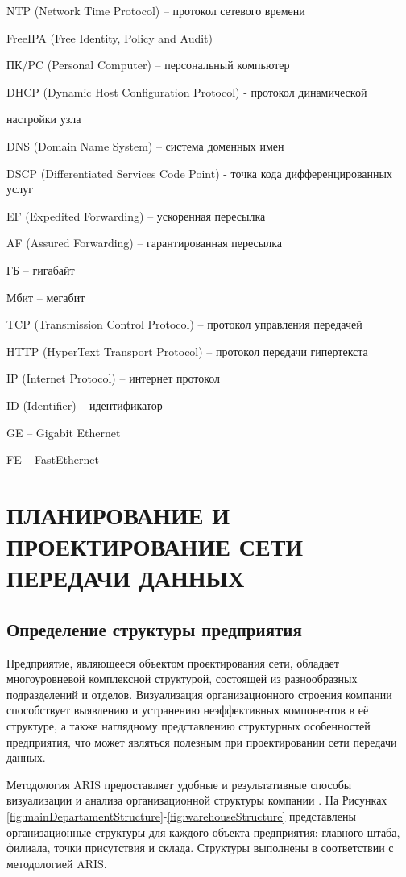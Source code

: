 \documentclass[14pt, a4paper]{extarticle}
\numberwithin{equation}{section}
\begin{document}
NTP (Network Time Protocol) – протокол сетевого времени

FreeIPA (Free Identity, Policy and Audit)

ПК/PC (Personal Computer) – персональный компьютер

DHCP (Dynamic Host Configuration Protocol) - протокол динамической

настройки узла

DNS (Domain Name System) – система доменных имен

DSCP (Differentiated Services Code Point) - точка кода дифференцированных
услуг

EF (Expedited Forwarding) – ускоренная пересылка

AF (Assured Forwarding) – гарантированная пересылка

ГБ – гигабайт

Мбит – мегабит

TCP (Transmission Control Protocol) – протокол управления передачей

HTTP (HyperText Transport Protocol) – протокол передачи гипертекста

IP (Internet Protocol) – интернет протокол

ID (Identifier) – идентификатор

GE – Gigabit Ethernet

FE – FastEthernet


\section{ПЛАНИРОВАНИЕ И ПРОЕКТИРОВАНИЕ СЕТИ ПЕРЕДАЧИ ДАННЫХ}

\subsection{Определение структуры предприятия}
Предприятие, являющееся объектом проектирования сети, обладает многоуровневой 
комплексной структурой, состоящей из разнообразных подразделений и отделов. 
Визуализация организационного строения компании способствует выявлению и устранению
неэффективных компонентов в её структуре, а также наглядному представлению структурных
особенностей предприятия, что может являться полезным при проектировании сети передачи
данных.


Методология ARIS предоставляет удобные и результативные 
способы визуализации и анализа организационной структуры компании \cite{davis2007aris}. На Рисунках 
\ref{fig:mainDepartamentStructure}-\ref{fig:warehouseStructure} представлены
организационные структуры для каждого объекта предприятия: главного штаба, филиала, точки присутствия и склада. Структуры выполнены в соответствии с методологией ARIS.
\end{document}
